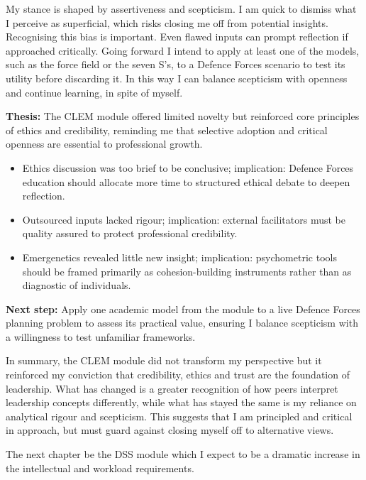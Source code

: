 My stance is shaped by assertiveness and scepticism. I am quick to dismiss what I perceive as superficial, which risks closing me off from potential insights. Recognising this bias is important. Even flawed inputs can prompt reflection if approached critically. Going forward I intend to apply at least one of the models, such as the force field or the seven S’s, to a Defence Forces scenario to test its utility before discarding it. In this way I can balance scepticism with openness and continue learning, in spite of myself.  

\textbf{Thesis:} The CLEM module offered limited novelty but reinforced core principles of ethics and credibility, reminding me that selective adoption and critical openness are essential to professional growth.  

\begin{itemize}
	\item Ethics discussion was too brief to be conclusive; implication: Defence Forces education should allocate more time to structured ethical debate to deepen reflection.  
	\item Outsourced inputs lacked rigour; implication: external facilitators must be quality assured to protect professional credibility.  
	\item Emergenetics revealed little new insight; implication: psychometric tools should be framed primarily as cohesion-building instruments rather than as diagnostic of individuals.  
\end{itemize}

\textbf{Next step:} Apply one academic model from the module to a live Defence Forces planning problem to assess its practical value, ensuring I balance scepticism with a willingness to test unfamiliar frameworks.  

In summary, the CLEM module did not transform my perspective but it reinforced  my conviction that credibility, ethics and trust are the foundation of leadership. 
What has changed is a greater recognition of how peers interpret leadership concepts differently, while what has stayed the same is my reliance on analytical rigour and scepticism.  This suggests that I am principled and critical in approach, but must guard against closing myself off to alternative views. 

The next chapter be the DSS module which I expect to be a dramatic increase in the intellectual and workload requirements.